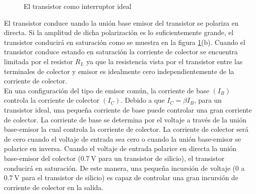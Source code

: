 \documentclass{article}
\begin{document}
\begin{figure}[H]
	\caption{El transistor como interruptor ideal}	
	\label{ch2f1}
\end{figure}

El transistor conduce uando la unión base emisor del transistor se polariza en directa. Si la amplitud de dicha polarización es lo suficientemente grande, el transistor conducirá en saturación como se muestra en la figura \ref{ch2f1}(b). Cuando el transistor conduce estando en saturación la corriente de colector se encuentra limitada por el resistor $R_L$ ya que la resistencia vista por el transistor entre las terminales de colector y emisor es idealmente cero independientemente de la corriente de colector. \\

En una configuración del tipo de emisor común, la corriente de base $(I_B)$ controla la corriente de colector $(I_C)$. Debido a que $I_C = \beta I_B$, para un transistor ideal, una pequeña corriente de base puede controlar una gran corriente de colector. La corriente de base se determina por el voltaje a través de la unión base-emisor la cual controla la corriente de colector. La corriente de colector será de cero cuando el voltaje de entrada sea cero o cuando la unión base-emisor se polarice en inversa. Cuando el voltaje de entrada polarice en directa la unión base-emisor del colector ($\qty{0.7}{\volt}$ para un transistor de silicio), el transistor conducirá en saturación. De este manera, una pequeña incursión de voltaje ($0$ a $\qty{0.7}{\volt}$ para el transistor de silicio) es capaz de controlar una gran incursión de corriente de colector en la salida. \\
\end{document}
